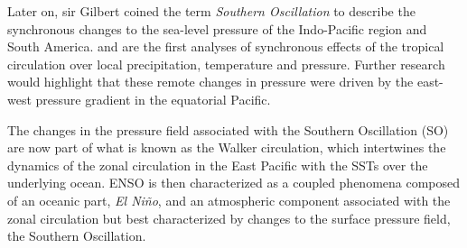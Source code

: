  
 
  Later on, sir Gilbert \cite{walker1924} coined the term \textit{Southern Oscillation} to describe the synchronous changes to the sea-level pressure of the Indo-Pacific region and South America. 
  \cite{walker1924} and \cite{walker1932} are the first analyses of synchronous effects of the tropical circulation over local precipitation, temperature and pressure. Further research \citep[e.g.][]{troup1965} would highlight that these remote changes in pressure were driven by the east-west pressure gradient in the equatorial Pacific. 
  
  The changes in the pressure field associated with the Southern Oscillation (SO) are now part of what is known as the Walker circulation, which intertwines the dynamics of the zonal circulation in the East Pacific with the SSTs over the underlying ocean. ENSO is then characterized as a coupled phenomena composed of an oceanic part, \textit{El Niño}, and an atmospheric component associated with the zonal circulation but best characterized by changes to the surface pressure field, the Southern Oscillation. 
  
  
  
